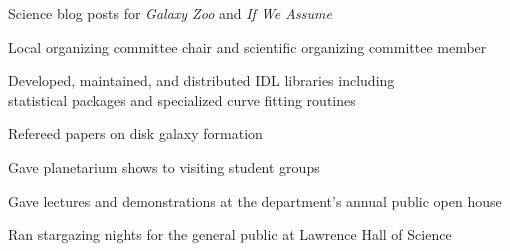 

Science blog posts for {\it Galaxy Zoo} and {\it If We Assume}

Local organizing committee chair and scientific organizing committee 
member %

Developed, maintained, and distributed IDL libraries including \\
statistical packages and specialized curve fitting routines

Refereed papers on disk galaxy formation

Gave planetarium shows to visiting student groups 

Gave lectures and demonstrations at the department's annual public open house

Ran stargazing nights for the general public at Lawrence Hall of Science